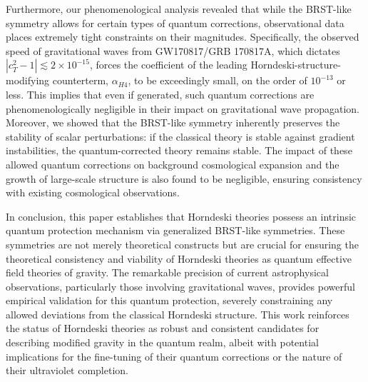 \documentclass[twocolumn]{aastex631}
\begin{document}
Furthermore, our phenomenological analysis revealed that while the BRST-like symmetry allows for certain types of quantum corrections, observational data places extremely tight constraints on their magnitudes. Specifically, the observed speed of gravitational waves from GW170817/GRB 170817A, which dictates $ |c_T^2 - 1| \lesssim 2 \times 10^{-15} $, forces the coefficient of the leading Horndeski-structure-modifying counterterm, $ \alpha_{H4} $, to be exceedingly small, on the order of $ 10^{-13} $ or less. This implies that even if generated, such quantum corrections are phenomenologically negligible in their impact on gravitational wave propagation. Moreover, we showed that the BRST-like symmetry inherently preserves the stability of scalar perturbations: if the classical theory is stable against gradient instabilities, the quantum-corrected theory remains stable. The impact of these allowed quantum corrections on background cosmological expansion and the growth of large-scale structure is also found to be negligible, ensuring consistency with existing cosmological observations.

In conclusion, this paper establishes that Horndeski theories possess an intrinsic quantum protection mechanism via generalized BRST-like symmetries. These symmetries are not merely theoretical constructs but are crucial for ensuring the theoretical consistency and viability of Horndeski theories as quantum effective field theories of gravity. The remarkable precision of current astrophysical observations, particularly those involving gravitational waves, provides powerful empirical validation for this quantum protection, severely constraining any allowed deviations from the classical Horndeski structure. This work reinforces the status of Horndeski theories as robust and consistent candidates for describing modified gravity in the quantum realm, albeit with potential implications for the fine-tuning of their quantum corrections or the nature of their ultraviolet completion.
\end{document}
